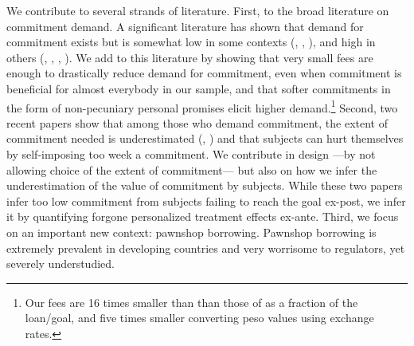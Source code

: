 \documentclass[11pt]{article}
\begin{document}
We contribute to several strands of literature. First, to the broad literature on commitment demand. A significant literature has shown that demand for commitment exists but is somewhat low in some contexts (\cite{Ashraf}, \cite{Gine}, \cite{Ted}), and high in others (\cite{Kremer},  \cite{Casaburi}, \cite{Alcohol}, \cite{AprajitP&P}). We add to this literature by showing that very small fees are enough to drastically reduce demand for commitment, even when commitment is beneficial for almost everybody in our sample, and that softer commitments in the form of non-pecuniary personal promises elicit higher demand.\footnote{Our fees are 16 times smaller than than those of \cite{John} as a fraction of the loan/goal, and five times smaller converting peso values using exchange rates.} Second, two recent papers show that among those who demand commitment, the extent of commitment needed is underestimated (\cite{Ted}, \cite{John}) and that subjects can hurt themselves by self-imposing too week a commitment. We contribute in design ---by not allowing choice of the extent of commitment--- but also on how we infer the underestimation of the value of commitment by subjects. While these two papers infer too low commitment from subjects failing to reach the goal ex-post, we infer it by quantifying forgone personalized treatment effects ex-ante. Third, we focus on an important new context: pawnshop borrowing. Pawnshop borrowing is extremely prevalent in developing countries and very worrisome to regulators, yet severely understudied. 
\end{document}
